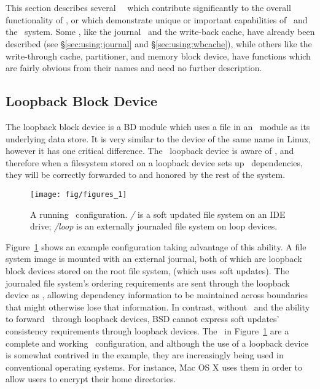 \section{\Modules}
\label{sec:modules}

This section describes several \Kudos\ \modules\ which contribute significantly
to the overall functionality of \Kudos, or which demonstrate unique or
important capabilities of \chdescs\ and the \module\ system. Some \modules,
like the journal \module\ and the write-back cache, have already been described
(see \S\ref{sec:using:journal} and \S\ref{sec:using:wbcache}), while others
like the write-through cache, partitioner, and memory block device, have
functions which are fairly obvious from their names and need no further
description.





\subsection{Loopback Block Device}
\label{sec:modules:loop}

The loopback block device is a BD module which uses a file in an \LFS\ module as
its underlying data store. It is very similar to the device of the same name in
Linux, however it has one critical difference. The \Kudos\ loopback device is
aware of \chdescs, and therefore when a filesystem stored on a loopback device
sets up \chdesc\ dependencies, they will be correctly forwarded to and honored
by the rest of the system.

\begin{figure}[htb]
  \centering
  \texttt{[image: fig/figures\_1]}
  \caption{A running \Kudos\ configuration. {\it/} is a soft updated
    file system on an IDE drive; {\it/loop} is an externally journaled
    file system on loop devices.}
  \label{fig:kfs-graph}
\end{figure}

Figure~\ref{fig:kfs-graph} shows an example configuration taking advantage of
this ability. A file system image is mounted with an external journal, both of
which are loopback block devices stored on the root file system, (which uses
soft updates). The journaled file system's ordering requirements are sent
through the loopback device as \chdescs, allowing dependency information to be
maintained across boundaries that might otherwise lose that information. In
contrast, without \chdescs\ and the ability to forward \chdescs\ through
loopback devices, BSD cannot express soft updates' consistency requirements
through loopback devices. The \modules\ in Figure~\ref{fig:kfs-graph} are a
complete and working \Kudos\ configuration, and although the use of a loopback
device is somewhat contrived in the example, they are increasingly being used in
conventional operating systems. For instance, Mac OS X uses them in order to
allow users to encrypt their home directories.

